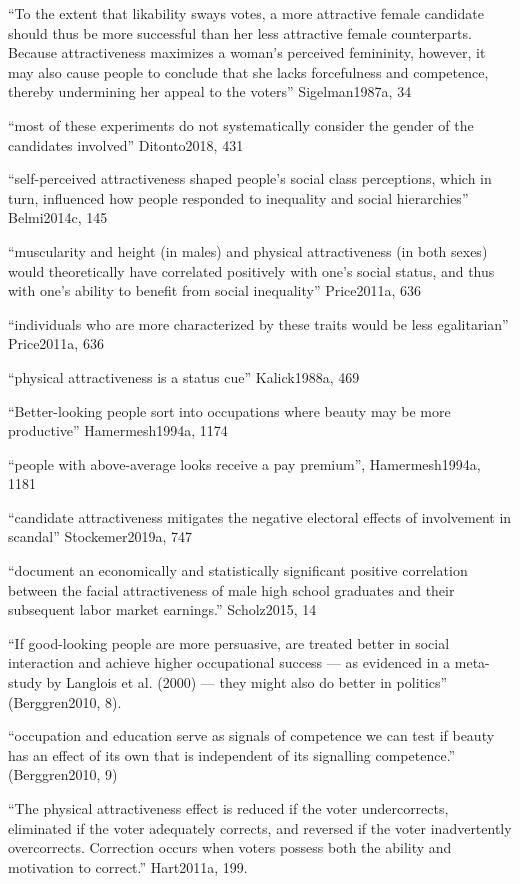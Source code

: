 ``To the extent that likability sways votes, a more attractive female candidate should thus be more successful than her less attractive female counterparts. Because attractiveness maximizes a woman's perceived femininity, however, it may also cause people to conclude that she lacks forcefulness and competence, thereby undermining her appeal to the voters''  Sigelman1987a, 34

``most of these experiments do not systematically consider the gender of the candidates involved'' Ditonto2018, 431


``self-perceived attractiveness shaped people's social class perceptions, which in turn, influenced how people responded to inequality and social hierarchies'' Belmi2014c, 145

``muscularity and height (in males) and physical attractiveness (in both sexes) would theoretically have correlated positively with one’s social status, and thus with one's ability to benefit from social inequality'' Price2011a, 636

``individuals who are more characterized by these traits would be less egalitarian'' Price2011a, 636

``physical attractiveness is a status cue'' Kalick1988a, 469

``Better-looking people sort into occupations where beauty may be more productive'' Hamermesh1994a, 1174


		``people with above-average looks receive a pay premium'', Hamermesh1994a, 1181

		``candidate attractiveness mitigates the negative electoral effects of involvement in scandal'' Stockemer2019a, 747

``document an economically and statistically significant positive correlation between the facial attractiveness of male high school graduates and their subsequent labor market earnings.'' Scholz2015, 14

``If good-looking people are more persuasive, are treated better in social interaction and achieve higher occupational success — as evidenced in a meta-study by Langlois et al. (2000) — they might also do better in politics'' (Berggren2010, 8).

``occupation and education serve as signals of competence we can test if beauty has an effect of its own that is independent of its signalling competence.'' (Berggren2010, 9)

``The physical attractiveness effect is reduced if the voter undercorrects, eliminated if the voter adequately corrects, and reversed if the voter inadvertently overcorrects. Correction occurs when voters possess both the ability and motivation to correct.'' Hart2011a, 199.

